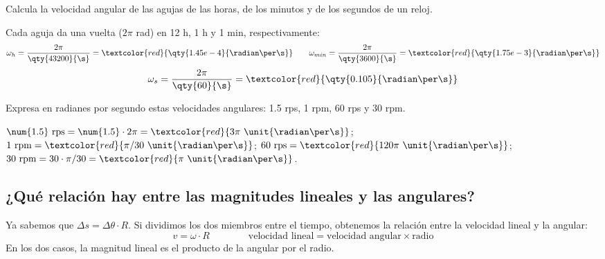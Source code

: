 \begin{exercise}
    Calcula la velocidad angular de las agujas de las horas, de los minutos y de los segundos de un reloj.
    \begin{solu}
        Cada aguja da una vuelta (\(2\pi\) rad) en 12 h, 1 h y 1 min, respectivamente:
        \[ \omega_h = \frac{2\pi}{\qty{43200}{\s}} = \textcolor{red}{\qty{1.45e-4}{\radian\per\s}} \qquad \omega_{min} = \frac{2\pi}{\qty{3600}{\s}} = \textcolor{red}{\qty{1.75e-3}{\radian\per\s}} \]
        \[ \omega_s = \frac{2\pi}{\qty{60}{\s}} = \textcolor{red}{\qty{0.105}{\radian\per\s}} \]
    \end{solu}
\end{exercise}

\begin{exercise}
    Expresa en radianes por segundo estas velocidades angulares: \num{1.5} rps, 1 rpm, 60 rps y 30 rpm.
    \begin{solu}
        \(\num{1.5}~\text{rps} = \num{1.5} \cdot 2\pi = \textcolor{red}{3\pi~\unit{\radian\per\s}}\); \(1~\text{rpm} = \textcolor{red}{\pi/30~\unit{\radian\per\s}}\); \(60~\text{rps} = \textcolor{red}{120\pi~\unit{\radian\per\s}}\); \(30~\text{rpm} = 30 \cdot \pi/30 = \textcolor{red}{\pi~\unit{\radian\per\s}}\).
    \end{solu}
\end{exercise}

\subsection{¿Qué relación hay entre las magnitudes lineales y las angulares?}

Ya sabemos que \(\Delta s = \Delta\theta \cdot R\). Si dividimos los dos miembros entre el tiempo, obtenemos la relación entre la velocidad lineal y la angular:
\[ v = \omega \cdot R \qquad\qquad \text{velocidad lineal} = \text{velocidad angular} \times \text{radio} \]
En los dos casos, la magnitud lineal es el producto de la angular por el radio.

